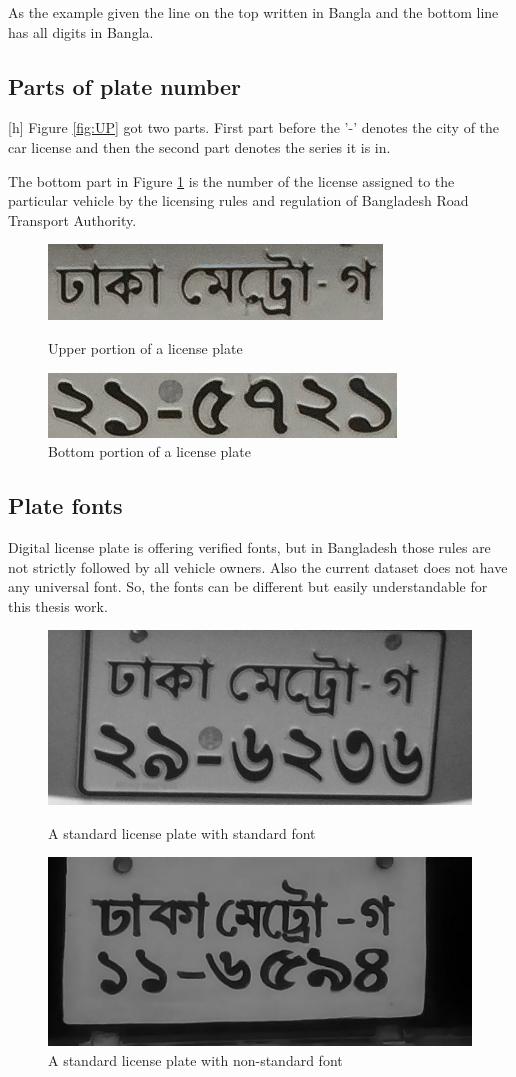 As the example given the line on the top written in Bangla and the bottom line has all digits in Bangla.    

\subsection{Parts of plate number}[h]
Figure \ref{fig:UP} got two parts. First part before the '-' denotes the city of the car license and then the second part denotes the series it is in.

The bottom part in Figure \ref{fig:DOWN} is the number of the license assigned to the particular vehicle by the licensing rules and regulation of Bangladesh Road Transport Authority.

\begin{figure}
\centering
\includegraphics[scale=0.6]{./img/up}
\caption{Upper portion of a license plate}
\label{fig:UP}

\includegraphics[scale=0.6]{./img/down}
\caption{Bottom portion of a license plate}
\label{fig:DOWN}
\end{figure} 

    
\subsection{Plate fonts}
Digital license plate is offering verified fonts, but in Bangladesh those rules are not strictly followed by all vehicle owners. Also the current dataset does not have any universal font. So, the fonts can be different but easily understandable for this thesis work.

\begin{figure}
\centering
\includegraphics[width=0.5\linewidth]{./img/experiment/stage.9/00-angle2}
\caption{A standard license plate with standard font}

\includegraphics[width=0.5\linewidth]{./img/experiment/stage.9/00-badfont}
\caption{A standard license plate with non-standard font}
\end{figure} 
